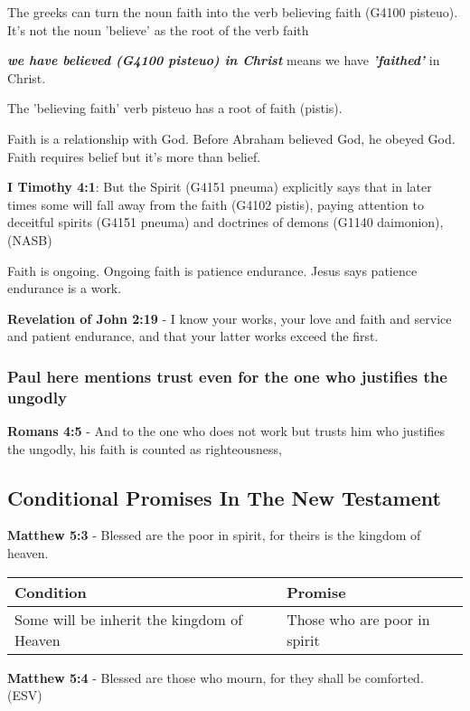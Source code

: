 \documentclass[11pt]{article}
\begin{document}
The greeks can turn the noun faith into the verb believing faith (G4100 pisteuo).
It's not the noun 'believe' as the root of the verb faith

\emph{\textbf{we have believed (G4100 pisteuo) in Christ}} means we have \emph{\textbf{'faithed'}} in Christ.

The 'believing faith' verb pisteuo has a root of faith (pistis).

Faith is a relationship with God.
Before Abraham believed God, he obeyed God.
Faith requires belief but it's more than belief.

\textbf{I Timothy 4:1}: But the Spirit (G4151 pneuma) explicitly says that in later times some will fall away from the faith (G4102 pistis), paying attention to deceitful spirits (G4151 pneuma) and doctrines of demons (G1140 daimonion), (NASB)

Faith is ongoing. Ongoing faith is patience endurance. Jesus says patience endurance is a work.

\textbf{Revelation of John 2:19} - I know your works, your love and faith and service and patient endurance, and that your latter works exceed the first.

\subsubsection{Paul here mentions trust even for the one who justifies the ungodly}
\label{sec:orgeee835f}
\textbf{Romans 4:5} - And to the one who does not work but trusts him who justifies the ungodly, his faith is counted as righteousness,

\subsection{Conditional Promises In The New Testament}
\label{sec:org24904e0}
\textbf{Matthew 5:3} - Blessed are the poor in spirit, for theirs is the kingdom of heaven.

\begin{center}
\begin{tabular}{ll}
Condition & Promise\\[0pt]
\hline
Some will be inherit the kingdom of Heaven & Those who are poor in spirit\\[0pt]
\end{tabular}
\end{center}

\textbf{Matthew 5:4} -  Blessed are those who mourn, for they shall be comforted.  (ESV)
\end{document}
